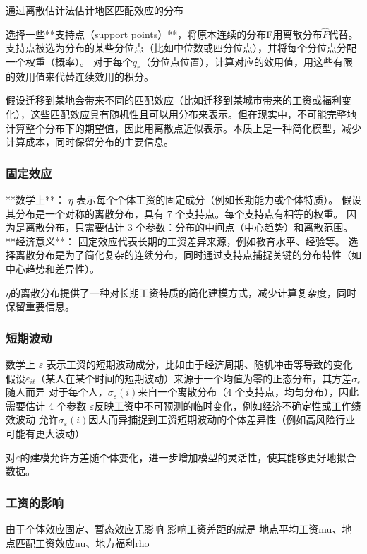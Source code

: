 \documentclass{article}
\numberwithin{equation}{section} %
\begin{document}
通过离散估计法估计地区匹配效应的分布

选择一些**支持点（support points）**，将原本连续的分布F用离散分布$\hat F$代替。
支持点被选为分布的某些分位点（比如中位数或四分位点），并将每个分位点分配一个权重（概率）。
对于每个$q_r$（分位点位置），计算对应的效用值，用这些有限的效用值来代替连续效用的积分。

假设迁移到某地会带来不同的匹配效应（比如迁移到某城市带来的工资或福利变化），这些匹配效应具有随机性且可以用分布来表示。但在现实中，不可能完整地计算整个分布下的期望值，因此用离散点近似表示。本质上是一种简化模型，减少计算成本，同时保留分布的主要信息。

\subsubsection{固定效应}

**数学上**：
$\eta$ 表示每个个体工资的固定成分（例如长期能力或个体特质）。
假设其分布是一个对称的离散分布，具有 7 个支持点。每个支持点有相等的权重。
因为是离散分布，只需要估计 3 个参数：分布的中间点（中心趋势）和离散范围。
**经济意义**：
固定效应代表长期的工资差异来源，例如教育水平、经验等。
选择离散分布是为了简化复杂的连续分布，同时通过支持点捕捉关键的分布特性（如中心趋势和差异性）。

$\eta$的离散分布提供了一种对长期工资特质的简化建模方式，减少计算复杂度，同时保留重要信息。

\subsubsection{短期波动}

数学上
$\varepsilon$ 表示工资的短期波动成分，比如由于经济周期、随机冲击等导致的变化
假设$\varepsilon_{it}$ ​（某人在某个时间的短期波动）来源于一个均值为零的正态分布，其方差$\sigma_{\epsilon}$随人而异
对于每个人，$\sigma_\varepsilon(i)$来自一个离散分布（4 个支持点，均匀分布），因此需要估计 4 个参数
$\varepsilon$反映工资中不可预测的临时变化，例如经济不确定性或工作绩效波动
允许$\sigma_\varepsilon(i)$因人而异捕捉到工资短期波动的个体差异性（例如高风险行业可能有更大波动）


对$\varepsilon$的建模允许方差随个体变化，进一步增加模型的灵活性，使其能够更好地拟合数据。

\subsubsection{工资的影响}

由于个体效应固定、暂态效应无影响
影响工资差距的就是
地点平均工资mu、地点匹配工资效应nu、地方福利rho
\end{document}
